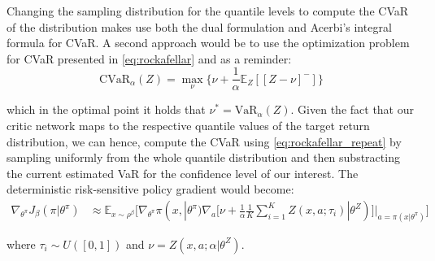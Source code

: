 Changing the sampling distribution for the quantile levels to compute the CVaR of the
distribution makes use both the dual formulation and Acerbi's integral formula for CVaR.
A second approach would be to use the \citet{Rockafellar2000} optimization problem
for CVaR presented in \ref{eq:rockafellar} and as a reminder:
\begin{equation}
    \text{CVaR}_\alpha (Z) = \underset{\nu} \max \big\{\nu + \frac{1}{\alpha} \mathbb E_Z[[Z- \nu]^-]\big\} \label{eq:rockafellar_repeat}
\end{equation}

which in the optimal point it holds that $\nu^*=\text{VaR}_\alpha(Z)$.
Given the fact that our critic network maps to the respective quantile values of the target
return distribution, we can hence, compute the CVaR using \ref{eq:rockafellar_repeat}
by sampling uniformly from  the whole quantile distribution and then substracting the current
estimated VaR for the confidence level of our interest.
The deterministic risk-sensitive policy gradient would become:
\begin{align}
    \nabla_{\theta^\pi} J_\beta(\pi | \theta^\pi) &\approx \mathbb E_{x \sim \rho^\beta} 
\big [\nabla_{\theta^\pi} \pi(x,| \theta^\pi) \nabla_a  [\nu + \frac{1}{\alpha} \frac{1}{K}
\sum_{i=1}^K Z(x,a; \tau_i) | \theta^Z)]|_{a=\pi(x| \theta^\pi)}  \big] \nonumber
\end{align}

where $\tau_i \sim U([0,1])$ and $\nu = Z(x,a; \alpha \vert \theta^Z)$.
